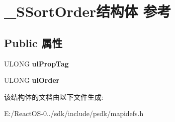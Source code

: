 \hypertarget{struct___s_sort_order}{}\section{\+\_\+\+S\+Sort\+Order结构体 参考}
\label{struct___s_sort_order}
\subsection*{Public 属性}
\begin{DoxyCompactItemize}
\item 
\mbox{\label{struct___s_sort_order_ac0b5aee175382065ccdcae39e51f72af}} 
U\+L\+O\+NG {\bfseries ul\+Prop\+Tag}
\item 
\mbox{\label{struct___s_sort_order_a2f5e374cee984791684bd304c4ad679e}} 
U\+L\+O\+NG {\bfseries ul\+Order}
\end{DoxyCompactItemize}


该结构体的文档由以下文件生成\+:\begin{DoxyCompactItemize}
\item 
E\+:/\+React\+O\+S-\/0../sdk/include/psdk/mapidefs.\+h\end{DoxyCompactItemize}
